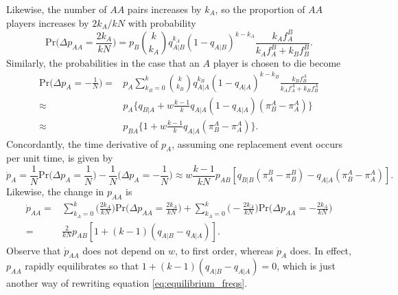 \documentclass[14pt, a4paper, justified]{article}
\begin{document}
Likewise, the number of $AA$ pairs increases by $k_A$, so the proportion of $AA$ players increases by $2k_A/kN$ with probability
\begin{equation}
    \mathrm{Pr} \Big( \Delta p_{AA} = \frac{2k_A}{kN} \Big) = p_B {k \choose k_A} q_{A|B}^{k_A} (1 - q_{A|B})^{k-k_A} \frac{k_A f_A^B}{k_A f_A^B + k_B f_B^B}.
\end{equation}
Similarly, the probabilities in the case that an $A$ player is chosen to die become
\begin{equation}
    \begin{split}
        \mathrm{Pr} \Big( \Delta p_A = -\frac{1}{N} \Big) = & p_A \sum_{k_B = 0}^k {k \choose k_B} q_{A|A}^{k_B} (1 - q_{A|A})^{k-k_B} \frac{k_B f_B^A}{k_A f_A^A + k_B f_B^A}
        \\
        \approx & p_A \Big\{ q_{B|A} + w \frac{k-1}{k} q_{A|A} (1-q_{A|A})(\pi_B^A - \pi_A^A) \Big\}
        \\
        \approx & p_{BA} \Big\{ 1 + w\frac{k-1}{k} q_{A|A} (\pi_B^A - \pi_A^A) \Big\}.
    \end{split}
\end{equation}
Concordantly, the time derivative of $p_A$, assuming one replacement event occurs per unit time, is given by
\begin{equation}
    \dot{p}_A = \frac{1}{N} \mathrm{Pr} \Big( \Delta p_A = \frac{1}{N} \Big) - \frac{1}{N} \Big( \Delta p_A = -\frac{1}{N} \Big) \approx w\frac{k-1}{kN} p_{AB} [ q_{B|B}(\pi_A^B - \pi_B^B) - q_{A|A} (\pi_B^A - \pi_A^A) ].
\end{equation}
Likewise, the change in $p_{AA}$ is
\begin{equation}
    \begin{split}
        \dot{p}_{AA} = & \sum_{k_A = 0}^k \Big( \frac{2k_A}{kN}) \mathrm{Pr} \Big( \Delta p_{AA} = \frac{2k_A}{kN} \Big) + \sum_{k_A = 0}^k \Big( -\frac{2k_A}{kN}) \mathrm{Pr} \Big( \Delta p_{AA} = -\frac{2k_A}{kN} \Big)
        \\
        = & \frac{2}{kN} p_{AB} [ 1 + (k-1) (q_{A|B} - q_{A|A})].
    \end{split}
\end{equation}
Observe that $\dot{p}_{AA}$ does not depend on $w$, to first order, whereas $\dot{p}_A$ does.
In effect, $p_{AA}$ rapidly equilibrates so that $1 + (k-1)(q_{A|B} - q_{A|A}) = 0$, which is just another way of rewriting equation \ref{eq:equilibrium_freqs}.



\end{document}
